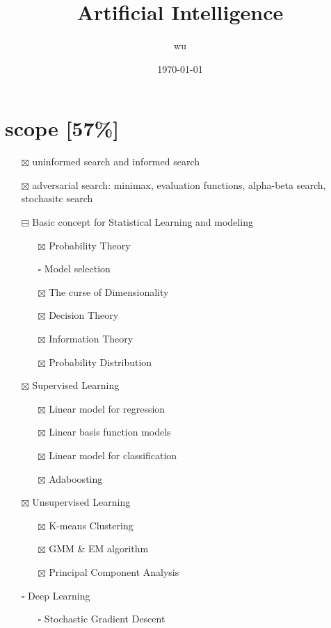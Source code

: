 \documentclass[11pt]{article}
\author{wu}
\date{\today}
\title{Artificial Intelligence}
\begin{document}
\maketitle
\tableofcontents

\section{scope [57\%]}
\label{sec:orgc3efa61}
\begin{itemize}
\item[{$\boxtimes$}] uninformed search and informed search
\item[{$\boxtimes$}] adversarial search: minimax, evaluation functions, alpha-beta search,
stochasitc search
\item[{$\boxminus$}] Basic concept for Statistical Learning and modeling
\begin{itemize}
\item[{$\boxtimes$}] Probability Theory
\item[{$\square$}] Model selection
\item[{$\boxtimes$}] The curse of Dimensionality
\item[{$\boxtimes$}] Decision Theory
\item[{$\boxtimes$}] Information Theory
\item[{$\boxtimes$}] Probability Distribution
\end{itemize}
\item[{$\boxtimes$}] Supervised Learning
\begin{itemize}
\item[{$\boxtimes$}] Linear model for regression
\item[{$\boxtimes$}] Linear basis function models
\item[{$\boxtimes$}] Linear model for classification
\item[{$\boxtimes$}] Adaboosting
\end{itemize}
\item[{$\boxtimes$}] Unsupervised Learning
\begin{itemize}
\item[{$\boxtimes$}] K-means Clustering
\item[{$\boxtimes$}] GMM \& EM algorithm
\item[{$\boxtimes$}] Principal Component Analysis
\end{itemize}
\item[{$\square$}] Deep Learning
\begin{itemize}
\item[{$\square$}] Stochastic Gradient Descent

\end{itemize}
\end{itemize}
\end{document}
